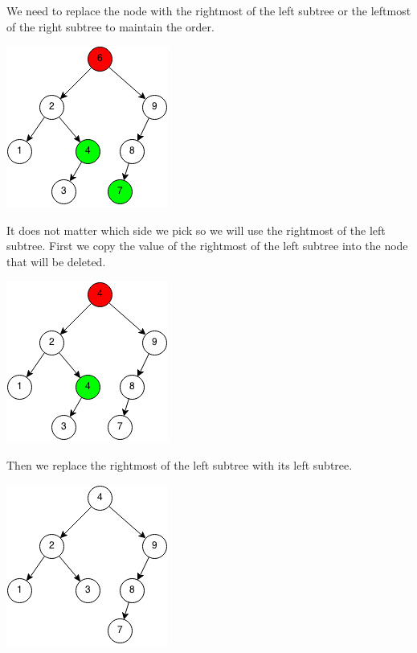 \documentclass[11pt,oneside]{book}
\makeatletter
\def\maxwidth#1{\ifdim\Gin@nat@width>#1 #1\else\Gin@nat@width\fi}
\makeatother
\begin{document}
We need to replace the node with the rightmost of the left subtree or the leftmost of the right subtree to maintain the order.

\vspace{5px}\includegraphics[width=\maxwidth{\textwidth}]{bst-rem-case32.png}

It does not matter which side we pick so we will use the rightmost of the left subtree. First we copy the value of the rightmost of the left subtree into the node that will be deleted.

\vspace{5px}\includegraphics[width=\maxwidth{\textwidth}]{bst-rem-case33.png}

Then we replace the rightmost of the left subtree with its left subtree.

\vspace{5px}\includegraphics[width=\maxwidth{\textwidth}]{bst-rem-case34.png}
\end{document}
